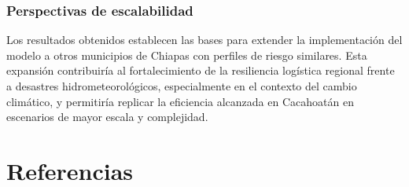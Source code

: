 \documentclass[
  spanish,
  us-letterpaper,
  DIV=11,
  numbers=noendperiod]{scrreprt}
\numberwithin{equation}{section}
\begin{document}
\subsection{Perspectivas de
escalabilidad}\label{perspectivas-de-escalabilidad}

Los resultados obtenidos establecen las bases para extender la
implementación del modelo a otros municipios de Chiapas con perfiles de
riesgo similares. Esta expansión contribuiría al fortalecimiento de la
resiliencia logística regional frente a desastres hidrometeorológicos,
especialmente en el contexto del cambio climático, y permitiría replicar
la eficiencia alcanzada en Cacahoatán en escenarios de mayor escala y
complejidad.


\chapter*{Referencias}\label{referencias}

\end{document}
